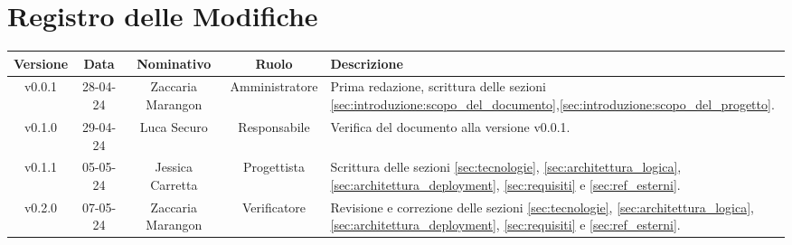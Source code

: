 \section*{\Large Registro delle Modifiche}
    \begin{table}[h]
        \centering
        \renewcommand\tabularxcolumn[1]{m{#1}} %
        \renewcommand{\arraystretch}{1.5}
        \begin{tabularx}{0.98\textwidth}
            {c|c|c|c|>{\centering\arraybackslash}X}
            \rowcolor{black}
            \textbf{\color{white} Versione} & \textbf{\color{white} Data} & \textbf{\color{white} Nominativo} & \textbf{\color{white} Ruolo} & \textbf{\color{white} Descrizione} \\ 
            \hline

            v0.0.1 & 28-04-24 & Zaccaria Marangon & Amministratore & Prima redazione, scrittura delle sezioni \ref{sec:introduzione:scopo_del_documento},\ref{sec:introduzione:scopo_del_progetto}. \\
            v0.1.0 & 29-04-24 & Luca Securo & Responsabile & Verifica del documento alla versione v0.0.1. \\
            v0.1.1 & 05-05-24 & Jessica Carretta & Progettista & Scrittura delle sezioni \ref{sec:tecnologie}, \ref{sec:architettura_logica}, \ref{sec:architettura_deployment}, \ref{sec:requisiti} e \ref{sec:ref_esterni}.\\
            v0.2.0 & 07-05-24 & Zaccaria Marangon & Verificatore & Revisione e correzione delle sezioni \ref{sec:tecnologie}, \ref{sec:architettura_logica}, \ref{sec:architettura_deployment}, \ref{sec:requisiti} e \ref{sec:ref_esterni}. \\
            \hline
        \end{tabularx}
    \end{table}